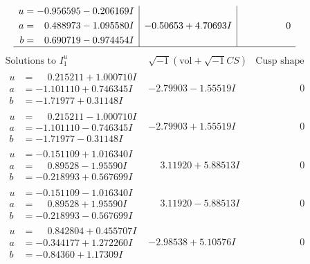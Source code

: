 \documentclass[1p]{elsarticle_modified}
\theoremstyle{definition}
\newcommand{\I}{\sqrt{-1}}
\begin{document}
$$\begin{array}{c|c|c}
\begin{aligned}
u &= -0.956595 - 0.206169 I \\
a &= \phantom{-}0.488973 - 1.095580 I \\
b &= \phantom{-}0.690719 - 0.974454 I\end{aligned}
 & -0.50653 + 4.70693 I & \phantom{-0.000000 } 0\\
 \hline 
 \end{array}$$\newpage$$\begin{array}{c|c|c}  
\text{Solutions to }I^u_{1}& \I (\text{vol} + \sqrt{-1}CS) & \text{Cusp shape}\\
 \hline 
\begin{aligned}
u &= \phantom{-}0.215211 + 1.000710 I \\
a &= -1.101110 + 0.746345 I \\
b &= -1.71977 + 0.31148 I\end{aligned}
 & -2.79903 - 1.55519 I & \phantom{-0.000000 } 0 \\ \hline\begin{aligned}
u &= \phantom{-}0.215211 - 1.000710 I \\
a &= -1.101110 - 0.746345 I \\
b &= -1.71977 - 0.31148 I\end{aligned}
 & -2.79903 + 1.55519 I & \phantom{-0.000000 } 0 \\ \hline\begin{aligned}
u &= -0.151109 + 1.016340 I \\
a &= \phantom{-}0.89528 - 1.95590 I \\
b &= -0.218993 + 0.567699 I\end{aligned}
 & \phantom{-}3.11920 + 5.88513 I & \phantom{-0.000000 } 0 \\ \hline\begin{aligned}
u &= -0.151109 - 1.016340 I \\
a &= \phantom{-}0.89528 + 1.95590 I \\
b &= -0.218993 - 0.567699 I\end{aligned}
 & \phantom{-}3.11920 - 5.88513 I & \phantom{-0.000000 } 0 \\ \hline\begin{aligned}
u &= \phantom{-}0.842804 + 0.455707 I \\
a &= -0.344177 + 1.272260 I \\
b &= -0.84360 + 1.17309 I\end{aligned}
 & -2.98538 + 5.10576 I & \phantom{-0.000000 } 0 \\ \hline\begin{aligned}

\end{aligned}
\end{array}$$
\end{document}

